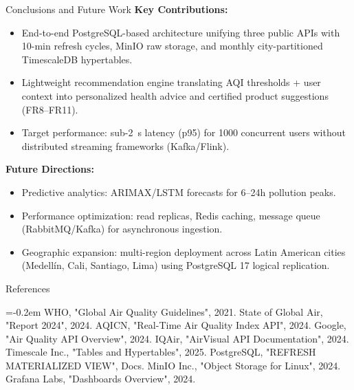 \documentclass[a0paper,portrait]{baposter}
\newcommand{\alert}[1]{{\color{udblue}#1}}
\begin{document}
\begin{poster}
\begin{posterbox}[name=conclusion,column=1,below=results]{Conclusions and Future Work}
\textbf{Key Contributions:}
\begin{itemize}
  \item \alert{End-to-end PostgreSQL-based architecture} unifying three public APIs with 10-min refresh cycles, MinIO raw storage, and monthly city-partitioned TimescaleDB hypertables.
  \item \alert{Lightweight recommendation engine} translating AQI thresholds + user context into personalized health advice and certified product suggestions (FR8--FR11).
  \item \alert{Target performance:} sub-2~s latency (p95) for 1000 concurrent users without distributed streaming frameworks (Kafka/Flink).
\end{itemize}
\textbf{Future Directions:}
\begin{itemize}
  \item Predictive analytics: ARIMAX/LSTM forecasts for 6--24h pollution peaks.
  \item Performance optimization: read replicas, Redis caching, message queue (RabbitMQ/Kafka) for asynchronous ingestion.
  \item Geographic expansion: multi-region deployment across Latin American cities (Medellín, Cali, Santiago, Lima) using PostgreSQL 17 logical replication.
\end{itemize}
\end{posterbox}

\begin{posterbox}[name=refs,column=1,below=conclusion]{References}
\scriptsize
\begin{thebibliography}{9}
\itemsep=-0.2em
 WHO, "Global Air Quality Guidelines", 2021.
 State of Global Air, "Report 2024", 2024.
 AQICN, "Real-Time Air Quality Index API", 2024.
 Google, "Air Quality API Overview", 2024.
 IQAir, "AirVisual API Documentation", 2024.
 Timescale Inc., "Tables and Hypertables", 2025.
 PostgreSQL, "REFRESH MATERIALIZED VIEW", Docs.
 MinIO Inc., "Object Storage for Linux", 2024.
 Grafana Labs, "Dashboards Overview", 2024.
\end{thebibliography}
\end{posterbox}

\end{poster}
\end{document}
